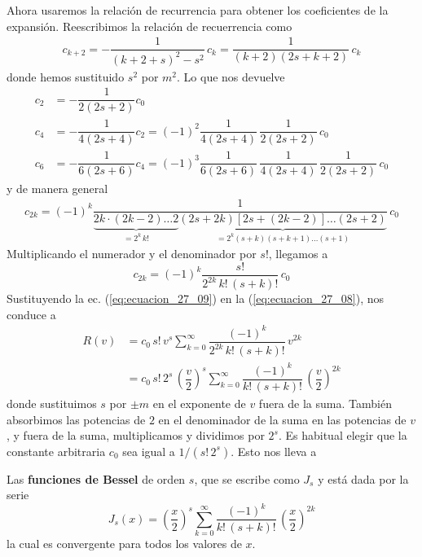 \par
Ahora usaremos la relación de recurrencia para obtener los coeficientes de la expansión. Reescribimos la relación de recuerrencia como
\begin{align*}
c_{k+2} = - \dfrac{1}{(k + 2 + s)^{2} - s^{2}} \, c_{k} = \dfrac{1}{(k + 2)(2 s + k + 2)} \, c_{k}
\end{align*}
donde hemos sustituido $s^{2}$ por $m^{2}$. Lo que nos devuelve
\begin{align*}
c_{2} &= - \dfrac{1}{2 (2 s + 2)} c_{0} \\
c_{4} &= - \dfrac{1}{4 (2 s + 4)} c_{2} = (-1)^{2} \dfrac{1}{4 (2 s + 4)} \, \dfrac{1}{2 (2 s + 2)} \, c_{0} \\
c_{6} &= - \dfrac{1}{6 (2 s + 6)} c_{4} = (-1)^{3} \dfrac{1}{6 (2 s + 6)} \, \dfrac{1}{4 (2 s + 4)} \, \dfrac{1}{2 (2 s + 2)} \, c_{0}
\end{align*}
y de manera general
\begin{align*}
c_{2k} = (-1)^{k} \dfrac{1}{\underbrace{2 k \cdot (2 k - 2) \ldots 2}_{=2^{k} \, k!} \underbrace{(2 s + 2 k)[2 s + (2 k - 2)] \ldots (2 s + 2)}_{=2^{k} (s + k)(s + k + 1) \ldots (s + 1)}} \, c_{0}
\end{align*}
Multiplicando el numerador y el denominador por $s!$, llegamos a
\begin{equation}
c_{2k} = (-1)^{k} \dfrac{s!}{2^{2k} \, k! \, (s+k)!} \, c_{0}
\label{eq:ecuacion_27_09}
\end{equation}
Sustituyendo la ec. (\ref{eq:ecuacion_27_09}) en la (\ref{eq:ecuacion_27_08}), nos conduce a
\begin{align*}
R(v) &= c_{0} \, s! \, v^{s} \sum_{k=0}^{\infty} \dfrac{(-1)^{k}}{2^{2k} \, k! \, (s + k)!} \, v^{2k} \\
&= c_{0} \, s! \, 2^{s} \, \left( \dfrac{v}{2} \right)^{s} \sum_{k=0}^{\infty} \dfrac{(-1)^{k}}{k! \, (s + k)!} \, \left( \dfrac{v}{2} \right)^{2 k} 
\end{align*}
donde sustituimos $s$ por $\pm m$ en el exponente de $v$ fuera de la suma. También absorbimos las potencias de $2$ en el denominador de la suma en las potencias de $v$, y fuera de la suma, multiplicamos y dividimos por $2^{s}$. Es habitual elegir que la constante arbitraria $c_{0}$ sea igual a $1/(s! \, 2^{s})$. Esto nos lleva a 
\begin{tcolorbox}
Las \textbf{funciones de Bessel} de orden $s$, que se escribe como $J_{s}$ y está dada por la serie
\begin{equation}
J_{s}(x) = \left( \dfrac{x}{2} \right)^{s} \sum_{k=0}^{\infty} \dfrac{(-1)^{k}}{k!\, (s + k)!} \, \left( \dfrac{x}{2} \right)^{2k}
\label{eq:ecuacion_27_10}
\end{equation}
la cual es convergente para todos los valores de $x$.
\end{tcolorbox}
